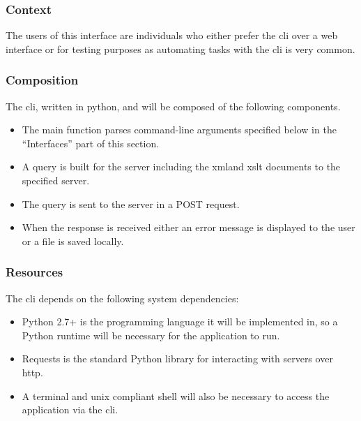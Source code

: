 \subsubsection{Context}

The users of this interface are individuals who either prefer the \gls{cli} over a web interface or for testing purposes as automating tasks with the \gls{cli} is very common.

\subsubsection{Composition}

The \gls{cli}, written in \gls{python}, and will be composed of the following components.

\begin{itemize}
  \item The main function parses command-line arguments specified below in the ``Interfaces'' part of this section.
    \item A query is built for the server including the \gls{xml}and \gls{xslt} documents to the specified server.
    \item The query is sent to the server in a POST request.
    \item When the response is received either an error message is displayed to the user or a file is saved locally.
\end{itemize}

\subsubsection{Resources}

The \gls{cli} depends on the following system dependencies:

\begin{itemize}
  \item {Python 2.7+} is the programming language it will be implemented in, so a Python runtime will be necessary for the application to run.
    \item {Requests} is the standard Python library for interacting with servers over \gls{http}.
    \item {A terminal and \gls{unix} compliant shell} will also be necessary to access the application via the \gls{cli}.
\end{itemize}

